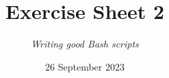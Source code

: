 




\title{{\vspace{-12mm}\huge\textbf{Exercise Sheet 2}}}
\author{\textit{Writing good Bash scripts}}
\date{{\small 26 September 2023}}


    \maketitle
    
    \bigskip
    
    \bigskip
    
    \newpage
    
    \newpage
    
    \bigskip
    
